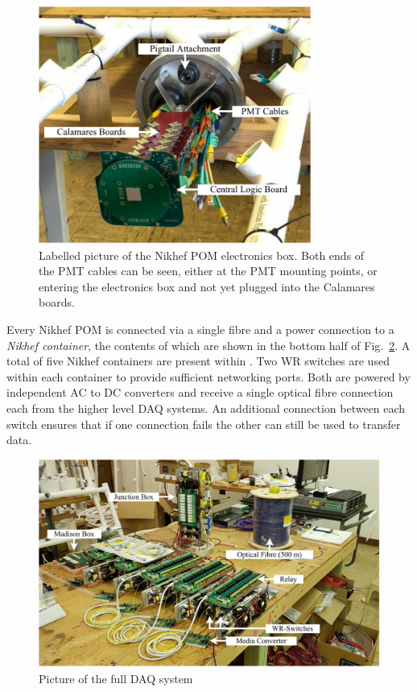 \begin{figure} %
    \includegraphics[width=0.8\textwidth]{diagrams/5-daq/nikhef_plane.pdf}
    \caption[Labelled picture of the Nikhef POM electronics box.]
    {Labelled picture of the Nikhef POM electronics box. Both ends of the PMT cables can be seen,
        either at the PMT mounting points, or entering the electronics box and not yet plugged
        into the Calamares boards.}
    \label{fig:nikhef_plane}
\end{figure}

Every Nikhef POM is connected via a single fibre and a power connection to a \emph{Nikhef
    container}, the contents of which are shown in the bottom half of Fig.~\ref{fig:full_setup}. A
total of five Nikhef containers are present within \chipsfive. Two WR switches are used within
each container to provide sufficient networking ports. Both are powered by independent AC to
DC converters and receive a single optical fibre connection each from the higher level DAQ
systems. An additional connection between each switch ensures that if one connection fails the
other can still be used to transfer data.

\begin{figure} %
    \includegraphics[width=\textwidth]{diagrams/5-daq/full_setup.pdf}
    \caption[full set up short]
    {Picture of the full \chipsfive DAQ system}
    \label{fig:full_setup}
\end{figure}

